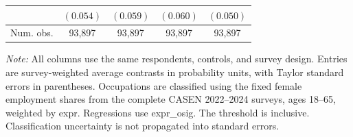 \begin{table}[htbp]
{\begin{tabular}{lcccc}
 & $(0.054)$ & $(0.059)$ & $(0.060)$ & $(0.050)$ \\
\hline
Num. obs. & 93,897 & 93,897 & 93,897 & 93,897 \\
\hline
\end{tabular}}
\par\smallskip
\begin{minipage}{\textwidth}\footnotesize
\textit{Note:} All columns use the same respondents, controls, and survey design. Entries are survey-weighted average contrasts in probability units, with Taylor standard errors in parentheses. Occupations are classified using the fixed female employment shares from the complete CASEN 2022--2024 surveys, ages 18--65, weighted by expr. Regressions use expr\_osig. The threshold is inclusive. Classification uncertainty is not propagated into standard errors.
\end{minipage}
\end{table}
